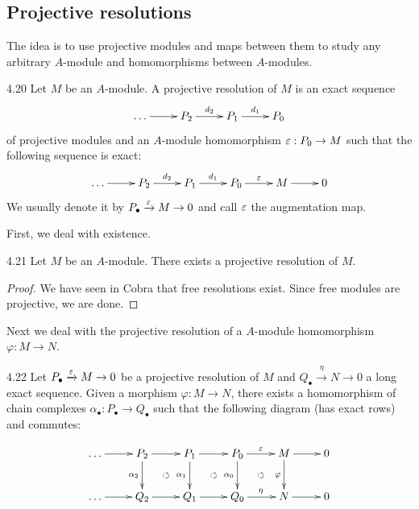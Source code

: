 \documentclass[twoside = false,	%
		headsepline,		%
		parskip = true,
		]{scrbook}						%
\begin{document}
\subsection{Projective resolutions}
    The idea is to use projective modules and maps between them to study any arbitrary $A$-module and homomorphisms  between $A$-modules.

    \begin{definition}{}{4.20}
        Let $M$ be an $A$-module. A projective resolution of $M$ is an exact sequence
        \begin{equation*}
            \xymatrix{
                \dots \ar[r] & P_2 \ar[r]^{d_2} & P_1 \ar[r]^{d_1} & P_0 
            }
        \end{equation*}
        of projective modules and an $A$-module homomorphism $\varepsilon: P_0 \to M$ such that the following sequence is exact:
        \begin{equation*}
        \xymatrix {
            \dots \ar[r] & P_2 \ar[r]^{d_2} & P_1 \ar[r]^{d_1} & P_0 \ar[r]^{\e} & M \ar[r] & 0
        }
        \end{equation*}
        We usually denote it by $P_\bullet \xrightarrow{\varepsilon} M \to 0$ and call $\varepsilon$ the augmentation map.
    \end{definition}

    First, we deal with existence.

    \begin{lemma}{}{4.21}
        Let $M$ be an $A$-module. There exists a projective resolution of $M$.
    \end{lemma}

    \begin{proof}
        We have seen in Cobra \cite{Cobra} that free resolutions exist. Since free modules are projective, we are done.
    \end{proof}

    Next we deal with the projective resolution of a $A$-module homomorphism $\varphi: M \to N$.

    \begin{proposition}{}{4.22}
        Let $P_\bullet \xrightarrow{\varepsilon} M \to 0$ be a projective resolution of $M$ and $Q_\bullet \xrightarrow{\eta} N \to 0$ a long exact sequence. Given a morphism $\varphi: M \to N$, there exists a homomorphism of chain complexes $\alpha_\bullet: P_\bullet \to Q_\bullet$ such that the following diagram (has exact rows) and commutes:

        \begin{equation*}
            \xymatrix {
                \dots \ar[r] & P_2 \ar[r] \ar[d]_{\alpha_2} & P_1 \ar[r] \ar[d]_{\alpha_1} & P_0 \ar[r]^{\e} \ar[d]_{\alpha_0}& M \ar[r] \ar[d]_{\varphi} & 0 \\
                \dots \ar[r] & Q_2 \ar[r] \ar@{}[ur]|{\circlearrowleft} & Q_1 \ar[r] \ar@{}[ur]|{\circlearrowleft} & Q_0 \ar[r]^{\eta} \ar@{}[ur]|{\circlearrowleft} & N \ar[r] & 0
            }
        \end{equation*}
    \end{proposition}
\end{document}
